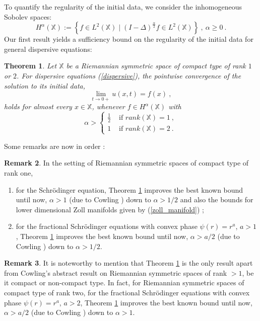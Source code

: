 \documentclass[12pt]{amsart}
\newtheorem{theorem}{Theorem}[section]
\theoremstyle{definition}
\newtheorem{remark}[theorem]{Remark}
\newcommand{\X}{\mathbb X}%
\numberwithin{equation}{section}
\begin{document}
\medskip

To quantify the regularity of the initial data, we consider the inhomogeneous Sobolev spaces:
\begin{equation} \label{Sobolev_space}
H^\alpha\left(\X\right):=\left\{f \in L^2 \left(\X\right) \mid \left(I-\Delta\right)^{\frac{\alpha}{2}}f \in L^2 \left(\X\right) \right\}\:,\:\alpha \ge 0\:.
\end{equation}
Our first result yields a sufficiency bound on the regularity of the initial data for general dispersive equations:
\begin{theorem} \label{result1}
Let $\X$ be a Riemannian symmetric space of compact type of rank $1$ or $2$. For dispersive equations (\ref{dispersive}), the pointwise convergence of the solution to its initial data,
\begin{equation*}
\displaystyle\lim_{t \to 0+} u(x,t)=f(x)\:,
\end{equation*}
holds for almost every $x \in \X$, whenever $f \in H^\alpha(\X)$ with 
\begin{equation*} 
\alpha > \begin{cases}
	 \frac{1}{2}  &\text{ if } rank(\X)=1\:, \\
	 1  &\text{ if } rank(\X)=2\:.
	\end{cases}
\end{equation*}
\end{theorem} 

Some remarks are now in order :
\begin{remark} \label{remark_result1}
In the setting of Riemannian symmetric spaces of compact type of rank one,
\begin{enumerate}
\item for the Schr\"odinger equation,  Theorem \ref{result1} improves the best known bound until now, $\alpha > 1$ (due to Cowling \cite{Cowling}) down to $\alpha > 1/2$ and also the bounds for lower dimensional Zoll manifolds given by (\ref{zoll_manifold}) \cite[Theorem 6.5]{WZ}; 

\item for the fractional Schr\"odinger equations with convex phase $\psi(r)=r^a$, $a>1$, Theorem \ref{result1} improves the best known bound until now, $\alpha > a/2$ (due to Cowling \cite{Cowling}) down to $\alpha > 1/2$.
\end{enumerate}
\end{remark}

\begin{remark} \label{remark_rank2}
It is noteworthy to mention that Theorem \ref{result1} is the only result apart from Cowling's abstract result \cite{Cowling} on Riemannian symmetric spaces of rank $>1$, be it compact or non-compact type. In fact, for Riemannian symmetric spaces of compact type of rank two, for the fractional Schr\"odinger equations with convex phase $\psi(r)=r^a$, $a>2$, Theorem \ref{result1} improves the best known bound until now, $\alpha > a/2$ (due to Cowling \cite{Cowling}) down to $\alpha > 1$.
\end{remark}
\end{document}
